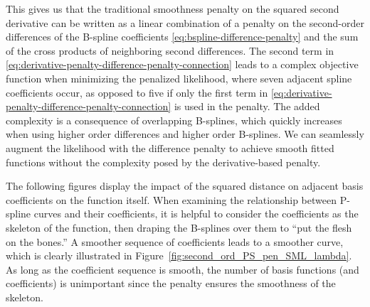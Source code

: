 \documentclass[12pt]{article}
\theoremstyle{definition}
\begin{document}
This gives us that the traditional smoothness penalty on the squared second derivative can be written as a linear combination of a penalty on the second-order differences of the B-spline coefficients \ref{eq:bspline-difference-penalty} and the sum of the cross products of neighboring second differences. The second term in \ref{eq:derivative-penalty-difference-penalty-connection} leads to a complex objective function when minimizing the penalized likelihood, where seven adjacent spline coefficients occur, as opposed to five if only the first term in \ref{eq:derivative-penalty-difference-penalty-connection} is used in the penalty. The added complexity is a consequence of overlapping B-splines, which quickly increases when using higher order differences and higher order B-splines. We can seamlessly augment the likelihood with the difference penalty to achieve smooth fitted functions without the complexity posed by the derivative-based penalty.

The following figures display the impact of the squared distance on adjacent basis coefficients on the function itself. When examining the relationship between P-spline curves and their coefficients, it is helpful to consider the coefficients as the skeleton of the function, then draping the B-splines over them to ``put the flesh on the bones.'' A smoother sequence of coefficients leads to a smoother curve, which is clearly illustrated in Figure~\ref{fig:second_ord_PS_pen_SML_lambda}. As long as the coefficient sequence is smooth, the number of basis functions (and coefficients) is unimportant since the penalty ensures the smoothness of the skeleton.
\end{document}
